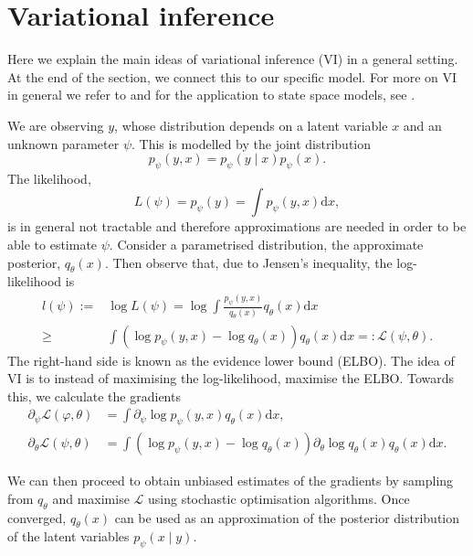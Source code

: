\documentclass[preprint,12pt]{elsarticle}
\newcommand{\pa}[1]{\left(#1\right)}
\def\dd{\ensuremath{\mathrm{d}}}
\begin{document}
\section{Variational inference}\label{sec:vi}
Here we explain the main ideas of variational inference (VI) in a general setting. At the end of the section, we connect this to our specific model. For more on VI in general we refer to \cite{ranganath2014black} and for the application to state space models, see \cite{archer2015black}.
 
We are observing $y$, whose distribution depends on a latent variable $x$ and an unknown parameter $\psi$. This is modelled by the joint distribution
\begin{equation}
	p_\psi(y,x) = p_\psi(y\mid x)p_\psi(x).
\end{equation}
The likelihood,
\begin{equation}
	L(\psi)=p_\psi(y) = \int p_\psi(y,x)\dd x,
\end{equation}
is in general not tractable and therefore approximations are needed in order to be able to estimate $\psi$.
Consider a parametrised distribution, the approximate posterior, $q_\theta(x)$. Then observe that, due to Jensen's inequality, the log-likelihood is
\begin{align*}
	l(\psi):=&\log L(\psi) = \log \int \frac{p_\psi(y,x)}{q_\theta(x)} q_\theta(x)\dd x  \\
    \geq &\int \pa{\log p_\psi(y,x) - \log q_\theta(x)}q_\theta(x)\dd x=:\mathcal L(\psi,\theta).
\end{align*}
The right-hand side is known as the evidence lower bound (ELBO). The idea of VI is to instead of maximising the log-likelihood, maximise the ELBO. Towards this, we calculate the gradients
\begin{align}
	\partial_\psi \mathcal L(\varphi,\theta) &= \int \partial_\psi \log p_\psi(y,x)q_\theta(x) \dd x ,\\
	\partial_\theta \mathcal L(\psi,\theta) &=  \int (\log p_\psi(y,x) - \log q_\theta(x))\partial_\theta \log q_\theta(x)  q_\theta(x)   \dd x.
\end{align}

We can then proceed to obtain unbiased estimates of the gradients by sampling from $q_\theta$ and maximise $\mathcal L$ using stochastic optimisation algorithms. Once converged,  $q_\theta(x)$ can be used as an approximation of the posterior distribution of the latent variables $p_\psi(x\mid y)$.
\end{document}

